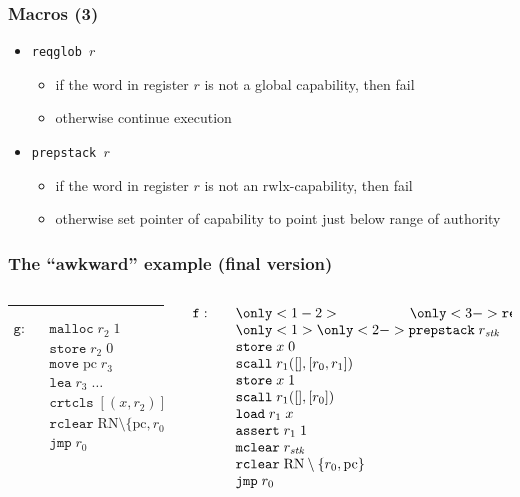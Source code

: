 \documentclass{beamer}
\newcommand{\var}[1]{\mathit{#1}}
\newcommand{\pcreg}{\mathrm{pc}}
\newcommand{\stk}{\var{stk}}
\newcommand{\plaindom}[1]{\mathrm{#1}}
\newcommand{\zinstr}[1]{\mathtt{#1}}
\newcommand{\oneinstr}[2]{\zinstr{#1} \; #2}
\newcommand{\jmp}[1]{\oneinstr{jmp}{#1}}
\newcommand{\twoinstr}[3]{\zinstr{#1} \; #2 \; #3}
\newcommand{\move}[2]{\twoinstr{move}{#1}{#2}}
\newcommand{\store}[2]{\twoinstr{store}{#1}{#2}}
\newcommand{\load}[2]{\twoinstr{load}{#1}{#2}}
\newcommand{\lea}[2]{\twoinstr{lea}{#1}{#2}}
\newcommand{\plainperm}[1]{\mathrm{#1}}
\newcommand{\rwlx}{\plainperm{rwlx}}
\begin{document}
\begin{frame}
  \frametitle{Macros (3)}
  \begin{itemize}[<+->]
  \item \texttt{reqglob $r$}
    \begin{itemize}
    \item if the word in register $r$ is not a global capability, then fail
    \item otherwise continue execution
    \end{itemize}
  \item \texttt{prepstack $r$}
    \begin{itemize}
    \item if the word in register $r$ is not an $\rwlx$-capability, then fail
    \item otherwise set pointer of capability to point just below range of authority
    \end{itemize}
  \end{itemize}
\end{frame}

\begin{frame}
 \frametitle{The ``awkward'' example (final version)}
 \begin{columns}
 \begin{column}{0.45\textwidth}
   \scalebox{.75}{\usebox{\awkwardex}}
   \rule{\textwidth}{0.4pt}
\[
  \begin{array}{lcl}
\mathtt{g}:
  &  &\mathtt{malloc} \; r_2 \; 1\\
  &  &\store{r_2}{0}\\
  &  &\move{\pcreg}{r_3}\\
  &  &\lea{r_3}{\dots}\\
  &  &\mathtt{crtcls} \;[(x, r_2)] \; r_3\\
  &  &\mathtt{rclear} \; \plaindom{RN} \setminus \{\pcreg,r_0,r_1 \}\\
  &  &\jmp{r_0}
  \end{array}
\]
 \end{column}
 \begin{column}{0.45\textwidth}
\[
\begin{array}{lcl}
\mathtt{f:}
  &  &\only<1-2>{\phantom{ \mathtt{reqglob} \; r1 }}
      \only<3->{\mathtt{reqglob} \; r1}\\
  &  &\only<1>{\phantom{ }}
      \only<2->{\mathtt{prepstack} \; r_\stk}\\
  &  &\store{x}{0}\\
  &  &\mathtt{scall} \; r_1([],[r_0,r_1])\\
  &  &\store{x}{1}\\
  &  &\mathtt{scall} \; r_1([],[r_0])\\
  &  &\load{r_1}{x}\\
  &  &\mathtt{assert} \; r_1 \; 1\\
  &  &\mathtt{mclear} \; r_\stk\\
  &  &\mathtt{rclear} \; \plaindom{RN} \setminus \{r_0,\pcreg \}\\
  &  &\jmp{r_0}
  \end{array}
\]
 \end{column}
\end{columns}

\end{frame}
\end{document}
